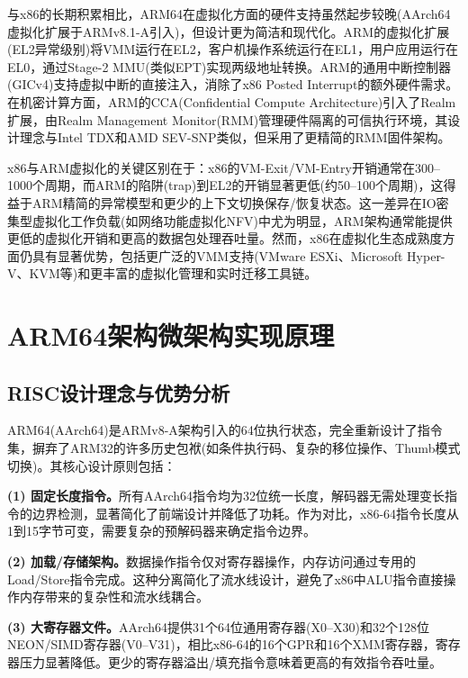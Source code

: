 \documentclass[12pt,a4paper]{IEEEtran}
\begin{document}
与x86的长期积累相比，ARM64在虚拟化方面的硬件支持虽然起步较晚(AArch64虚拟化扩展于ARMv8.1-A引入)，但设计更为简洁和现代化。ARM的虚拟化扩展(EL2异常级别)将VMM运行在EL2，客户机操作系统运行在EL1，用户应用运行在EL0，通过Stage-2 MMU(类似EPT)实现两级地址转换。ARM的通用中断控制器(GICv4)支持虚拟中断的直接注入，消除了x86 Posted Interrupt的额外硬件需求。在机密计算方面，ARM的CCA(Confidential Compute Architecture)引入了Realm扩展，由Realm Management Monitor(RMM)管理硬件隔离的可信执行环境，其设计理念与Intel TDX和AMD SEV-SNP类似，但采用了更精简的RMM固件架构\cite{arm2021armv9}。

x86与ARM虚拟化的关键区别在于：x86的VM-Exit/VM-Entry开销通常在300--1000个周期，而ARM的陷阱(trap)到EL2的开销显著更低(约50--100个周期)，这得益于ARM精简的异常模型和更少的上下文切换保存/恢复状态。这一差异在IO密集型虚拟化工作负载(如网络功能虚拟化NFV)中尤为明显，ARM架构通常能提供更低的虚拟化开销和更高的数据包处理吞吐量。然而，x86在虚拟化生态成熟度方面仍具有显著优势，包括更广泛的VMM支持(VMware ESXi、Microsoft Hyper-V、KVM等)和更丰富的虚拟化管理和实时迁移工具链。

\section{ARM64架构微架构实现原理}

\subsection{RISC设计理念与优势分析}

ARM64(AArch64)是ARMv8-A架构引入的64位执行状态，完全重新设计了指令集，摒弃了ARM32的许多历史包袱(如条件执行码、复杂的移位操作、Thumb模式切换)\cite{arm2021armv9}。其核心设计原则包括：

\textbf{(1) 固定长度指令。}所有AArch64指令均为32位统一长度，解码器无需处理变长指令的边界检测，显著简化了前端设计并降低了功耗。作为对比，x86-64指令长度从1到15字节可变，需要复杂的预解码器来确定指令边界。

\textbf{(2) 加载/存储架构。}数据操作指令仅对寄存器操作，内存访问通过专用的Load/Store指令完成。这种分离简化了流水线设计，避免了x86中ALU指令直接操作内存带来的复杂性和流水线耦合。

\textbf{(3) 大寄存器文件。}AArch64提供31个64位通用寄存器(X0--X30)和32个128位NEON/SIMD寄存器(V0--V31)，相比x86-64的16个GPR和16个XMM寄存器，寄存器压力显著降低。更少的寄存器溢出/填充指令意味着更高的有效指令吞吐量。
\end{document}
